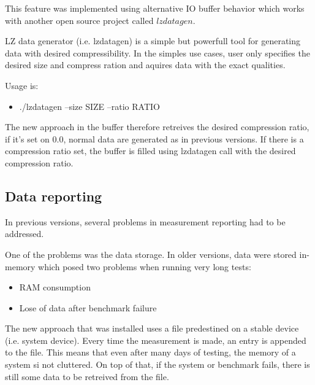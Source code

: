 \documentclass[
  color, %
  table, %
  lof,   %
  lot,   %
]{fithesis3}
\begin{document}
This feature was implemented using alternative IO buffer behavior which works with another open source project called $lzdatagen$.

LZ data generator (i.e. lzdatagen) is a simple but powerfull tool for generating data with desired compressibility. In the simples use cases, user only specifies the desired size and compress ration and aquires data with the exact qualities.

Usage is:
\begin{itemize}
    \item ./lzdatagen --size SIZE --ratio RATIO
\end{itemize}

The new approach in the buffer therefore retreives the desired compression ratio, if it's set on 0.0, normal data are generated as in previous versions. If there is a compression ratio set, the buffer is filled using lzdatagen call with the desired compression ratio.

\subsection{Data reporting}
In previous versions, several problems in measurement reporting had to be addressed.

One of the problems was the data storage. In older versions, data were stored in-memory which posed two problems when running very long tests:
\begin{itemize}
    \item RAM consumption
    \item Lose of data after benchmark failure
\end{itemize}

The new approach that was installed uses a file predestined on a stable device (i.e. system device). Every time the measurement is made, an entry is appended to the file. This means that even after many days of testing, the memory of a system si not cluttered. On top of that, if the system or benchmark fails, there is still some data to be retreived from the file.
\end{document}
